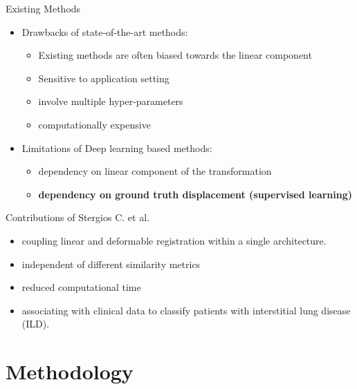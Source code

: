 \documentclass{beamer}
\begin{document}
\begin{frame}{Existing Methods}
	\begin{itemize}
  		\item Drawbacks of state-of-the-art methods:
  		    \begin{itemize}
  		        \item Existing methods are often biased towards the linear component
  		        \item Sensitive to application setting
  		        \item involve multiple hyper-parameters
  		        \item computationally expensive
  		    \end{itemize}
  		\pause
  		\item Limitations of Deep learning based methods:
  		    \begin{itemize}
  		        \item dependency on linear component of the transformation
  		        \item \textbf{dependency on ground truth displacement (supervised learning)}
  		    \end{itemize}
	\end{itemize}
\end{frame}

\begin{frame}{Contributions of Stergios C. et al.}
	\begin{itemize}
  		\item coupling linear and deformable registration within a single architecture.
  		\item independent of different similarity metrics
  		\item reduced computational time
  		\item associating with clinical data to classify patients with interstitial lung disease (ILD).
	\end{itemize}
\end{frame}

\section{Methodology}
\end{document}
